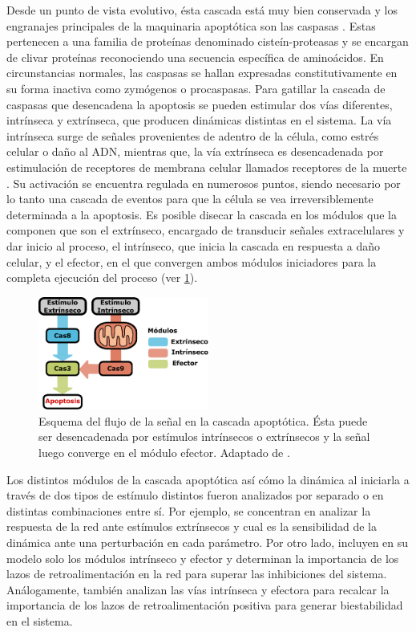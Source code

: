 Desde un punto de vista evolutivo, ésta cascada está muy bien conservada y los engranajes principales de la maquinaria apoptótica son las caspasas \citep{Sakamaki2009}. Estas pertenecen a una familia de proteínas denominado cisteín-proteasas y se encargan de clivar proteínas reconociendo una secuencia específica de aminoácidos. En circunstancias normales, las caspasas se hallan expresadas constitutivamente en su forma inactiva como zymógenos o procaspasas. Para gatillar la cascada de caspasas que desencadena la apoptosis se pueden estimular dos vías diferentes, intrínseca y extrínseca, que producen dinámicas distintas en el sistema. La vía intrínseca surge de señales provenientes de adentro de la célula, como estrés celular o daño al ADN, mientras que, la vía extrínseca es desencadenada por estimulación de receptores de membrana celular llamados receptores de la muerte \citep{Kominami2012a}. Su activación se encuentra regulada en numerosos puntos, siendo necesario por lo tanto una cascada de eventos para que la célula se vea irreversiblemente determinada a la apoptosis. Es posible disecar la cascada en los módulos que la componen que son el extrínseco, encargado de transducir señales extracelulares y dar inicio al proceso, el intrínseco, que inicia la cascada en respuesta a daño celular, y el efector, en el que convergen ambos módulos iniciadores para la completa ejecución del proceso (ver \cref{fig:Sketch}).

\begin{figure}
    \centering
    \includegraphics[width=0.5\textwidth]{img/cap_1/flujo_sketch.pdf}
    \caption{\footnotesize{Esquema del flujo de la señal en la cascada apoptótica. Ésta puede ser desencadenada por estímulos intrínsecos o extrínsecos y la señal luego converge en el módulo efector. Adaptado de \cite{Corbat2021}.}}
    \label{fig:Sketch}
\end{figure}

Los distintos módulos de la cascada apoptótica así cómo la dinámica al iniciarla a través de dos tipos de estímulo distintos fueron analizados por separado o en distintas combinaciones entre sí. Por ejemplo, \cite{Bentele2004} se concentran en analizar la respuesta de la red ante estímulos extrínsecos y cual es la sensibilidad de la dinámica ante una perturbación en cada parámetro. Por otro lado, \cite{Rehm2006} incluyen en su modelo solo los módulos intrínseco y efector y determinan la importancia de los lazos de retroalimentación en la red para superar las inhibiciones del sistema. Análogamente, \cite{Legewie2006} también analizan las vías intrínseca y efectora para recalcar la importancia de los lazos de retroalimentación positiva para generar biestabilidad en el sistema.

